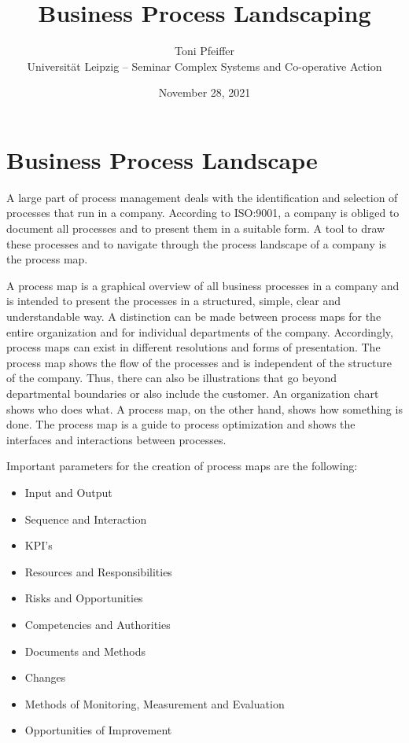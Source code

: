 \documentclass[11pt,a4paper]{article}
\title{Business Process Landscaping}
\author{Toni Pfeiffer\\[.3cm] Universität Leipzig -- Seminar Complex Systems
  and Co-operative Action }
\date{November 28, 2021}
\begin{document}
\maketitle

\section{Business Process Landscape}

A large part of process management deals with the identification and selection
of processes that run in a company. According to ISO:9001, a company is
obliged to document all processes and to present them in a suitable form. A
tool to draw these processes and to navigate through the process landscape of
a company is the process map.

A process map is a graphical overview of all business processes in a company
and is intended to present the processes in a structured, simple, clear and
understandable way. A distinction can be made between process maps for the
entire organization and for individual departments of the company.
Accordingly, process maps can exist in different resolutions and forms of
presentation. The process map shows the flow of the processes and is
independent of the structure of the company. Thus, there can also be
illustrations that go beyond departmental boundaries or also include the
customer. An organization chart shows who does what. A process map, on the
other hand, shows how something is done. The process map is a guide to process
optimization and shows the interfaces and interactions between processes.

Important parameters for the creation of process maps are the following:

\begin{itemize}
\item Input and Output
\item Sequence and Interaction
\item KPI's
\item Resources and Responsibilities
\item Risks and Opportunities
\item Competencies and Authorities
\item Documents and Methods
\item Changes
\item Methods of Monitoring, Measurement and Evaluation
\item Opportunities of Improvement
\end{itemize}
\end{document}
